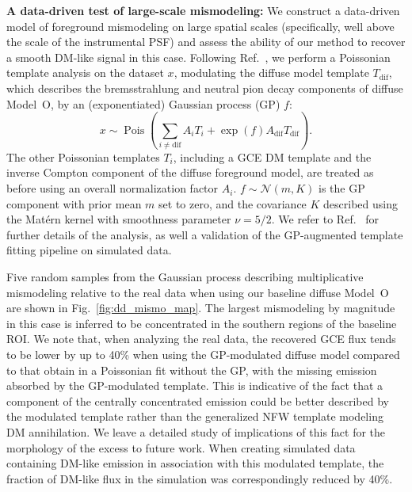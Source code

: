 \documentclass[prd,aps,10pt,nofootinbib,twocolumn,superscriptaddress,preprintnumbers,balancelastpage,longbibliography,floatfix]{revtex4-2}
\begin{document}
\noindent
\textbf{A data-driven test of large-scale mismodeling:}
We construct a data-driven model of foreground mismodeling on large spatial scales (specifically, well above the scale of the instrumental PSF) and assess the ability of our method to recover a smooth DM-like signal in this case. Following Ref.~\cite{Mishra-Sharma:2020kjb}, we perform a Poissonian template analysis on the \Fermi dataset $x$, modulating the diffuse model template $T_{\mathrm{dif}}$, which describes the bremsstrahlung and neutral pion decay components of diffuse {Model~O}, by an (exponentiated) Gaussian process (GP) $f$:
\begin{equation}
x \sim \operatorname{Pois}\left(\sum_{i \neq \mathrm{dif}} A_{i} T_{i}+\exp \left(f\right) A_{\mathrm{dif}} T_{\mathrm{dif}}\right).
\end{equation}
The other Poissonian templates $T_{i}$, including a GCE DM template and the inverse Compton component of the diffuse foreground model, are treated as before using an overall normalization factor $A_{i}$. $f \sim \mathcal{N}(m, K)$ is the GP component with prior mean $m$ set to zero, and the covariance $K$ described using the Mat\'ern kernel with smoothness parameter $\nu = 5/2$. We refer to Ref.~\cite{Mishra-Sharma:2020kjb} for further details of the analysis, as well a validation of the GP-augmented template fitting pipeline on simulated data.

Five random samples from the Gaussian process describing multiplicative mismodeling relative to the real \Fermi data when using our baseline diffuse {Model~O} are shown in Fig.~\ref{fig:dd_mismo_map}. The largest mismodeling by magnitude in this case is inferred to be concentrated in the southern regions of the baseline ROI. We note that, when analyzing the real \Fermi data, the recovered GCE flux tends to be lower by up to 40\% when using the GP-modulated diffuse model compared to that obtain in a Poissonian fit without the GP, with the missing emission absorbed by the GP-modulated template. This is indicative of the fact that a component of the centrally concentrated emission could be better described by the modulated template rather than the generalized NFW template modeling DM annihilation. We leave a detailed study of implications of this fact for the morphology of the excess to future work. When creating simulated data containing DM-like emission in association with this modulated template, the fraction of DM-like flux in the simulation was correspondingly reduced by 40\%.
\end{document}
